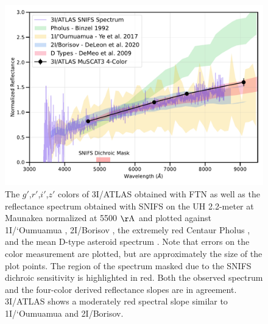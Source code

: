 \documentclass[twocolumn,longbib]{aastex7}
\begin{document}
\begin{CJK*}{UTF8}{gbsn}

\begin{figure}
\includegraphics[width=1.\linewidth]{figures/3I_color_comp_v3.pdf}
\caption{The $g'$,$r'$,$i'$,$z'$ colors of 3I/ATLAS obtained with FTN as well as the reflectance spectrum obtained with SNIFS on the UH 2.2-meter at Maunakea normalized at 5500 $\mathrm{\AA}$ and plotted against 1I/`Oumuamua \citep{Ye2017}, 2I/Borisov \citep{deleon2020}, the extremely red Centaur Pholus \citep{Binzel1992}, and the mean D-type asteroid spectrum \citep{DeMeo2009}. Note that errors on the color measurement are plotted, but are approximately the size of the plot points. The region of the spectrum masked due to the SNIFS dichroic sensitivity is highlighted in red. Both the observed spectrum and the four-color derived reflectance slopes are in agreement. 3I/ATLAS shows a moderately red spectral slope similar to 1I/`Oumuamua and 2I/Borisov.}
\label{fig:3I_colors}
\end{figure}



\end{CJK*}
\end{document}
